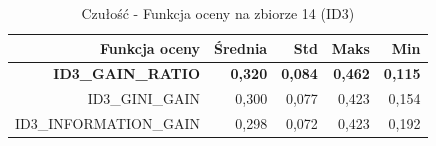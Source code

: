 \begin{table}[htbp]
\centering
\small
\setlength{\tabcolsep}{6pt}
\renewcommand{\arraystretch}{1.2}
\caption{Czułość - Funkcja oceny na zbiorze 14 (ID3)}
\label{tab:ID3_eval_function_14_recall}
\begin{tabular}{r|r|r|r|r}
\toprule
Funkcja oceny & Średnia & Std & Maks & Min \\
\hline
\textbf{ID3\_GAIN\_RATIO} & \textbf{0,320} & \textbf{0,084} & \textbf{0,462} & \textbf{0,115} \\
ID3\_GINI\_GAIN & 0,300 & 0,077 & 0,423 & 0,154 \\
ID3\_INFORMATION\_GAIN & 0,298 & 0,072 & 0,423 & 0,192 \\
\bottomrule
\end{tabular}
\end{table}